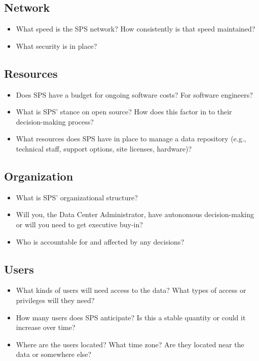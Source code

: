 \documentclass[10pt,oneside]{memoir}
\begin{document}
\subsection{Network}

\begin{itemize}
 \item What speed is the SPS network? How consistently is that speed maintained?
 \item What security is in place?
\end{itemize}

\subsection{Resources}

\begin{itemize}
 \item Does SPS have a budget for ongoing software costs? For software engineers?
 \item What is SPS' stance on open source? How does this factor in to their decision-making process?
 \item What resources does SPS have in place to manage a data repository (e.g., technical staff, support options, site licenses, hardware)?
\end{itemize}

\subsection{Organization}

\begin{itemize}
 \item What is SPS' organizational structure?
 \item Will you, the Data Center Administrator, have autonomous decision-making or will you need to get executive buy-in?
 \item Who is accountable for and affected by any decisions?
\end{itemize}

\subsection{Users}

\begin{itemize}
 \item What kinds of users will need access to the data? What types of access or privileges will they need?
 \item How many users does SPS anticipate? Is this a stable quantity or could it increase over time?
 \item Where are the users located? What time zone? Are they located near the data or somewhere else?
\end{itemize}
\end{document}

